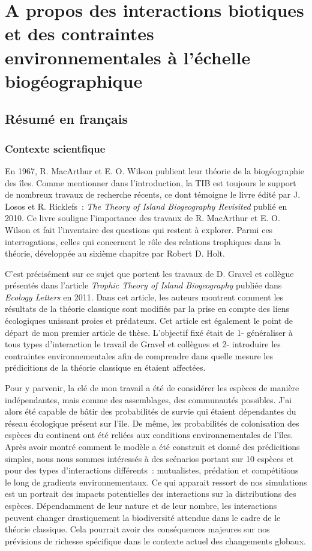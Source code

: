 \chapter{A propos des interactions biotiques et des contraintes environnementales à l'échelle biogéographique}
\label{chap1}

\section{Résumé en français}
%
\subsection{Contexte scientfique}

En 1967, R. MacArthur et E. O. Wilson publient leur théorie de la
biogéographie des îles. Comme mentionner dans l'introduction, la TIB est toujours le support de nombreux travaux de recherche récents,
ce dont témoigne le livre édité par J. Losos et R. Ricklefs~: \emph{The Theory of Island Biogeography Revisited} publié en 2010.
Ce livre souligne l'importance des travaux de R. MacArthur et E. O. Wilson et fait l'inventaire des questions qui restent à explorer.
Parmi ces interrogations, celles qui concernent le rôle des relations trophiques dans la théorie, développée au sixième chapitre par Robert D. Holt.

C'est précisément sur ce sujet que portent les travaux de D. Gravel et collègue présentés dans l'article \emph{Trophic Theory of Island Biogeography} publiée dans \emph{Ecology Letters} en 2011.
Dans cet article, les auteurs montrent comment les résultats de la théorie classique sont modifiés par la prise en compte des liens écologiques unissant proies et prédateurs.
Cet article est également le point de départ de mon premier article de thèse. L'objectif fixé était de 1- généraliser à tous types d'interaction le travail de Gravel et collègues
et 2- introduire les contraintes environnementales afin de comprendre dans quelle mesure les prédicitions de la théorie classique en étaient affectées.

Pour y parvenir, la clé de mon travail a été de considérer les espèces de manière indépendantes, mais comme des assemblages, des communautés possibles.
J'ai alors été capable de bâtir des probabilités de survie qui étaient dépendantes du réseau écologique présent sur l'île.
De même, les probabilités de colonisation des espèces du continent ont été reliées aux conditions environnementales de l'îles.
Après avoir montré comment le modèle a été construit et donné des prédicitions simples, nous nous sommes intéressés à des scénarios portant sur
10 espèces et pour des types d'interactions différents~: mutualistes, prédation et compétitions le long de gradients environnementaux.
Ce qui apparait ressort de nos simulations est un portrait des impacts potentielles des interactions sur la distributions des espèces.
Dépendamment  de leur nature et de leur nombre, les interactions peuvent changer drastiquement la biodiversité attendue dans le cadre de le théorie classique.
Cela pourrait avoir des conséquences majeures sur nos prévisions de richesse spécifique dans le contexte actuel des changements globaux.



